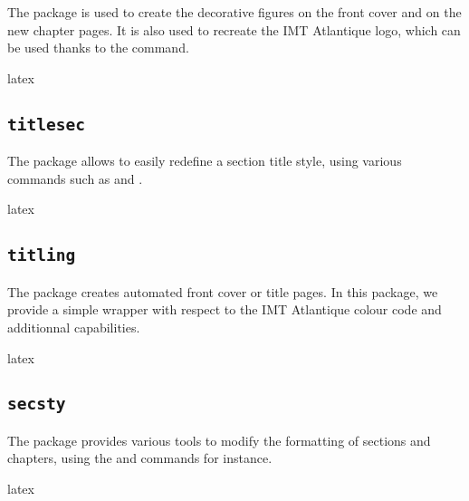 \documentclass{report}
\begin{document}
The  package is used to create the decorative figures on the front cover and on the new chapter pages. It is also used to recreate the IMT Atlantique logo, which can be used thanks to the  command.

\begin{imtaCode}{latex}
\RequirePackage{tikz}
\end{imtaCode}

\subsection{\texttt{titlesec}}

The  package allows to easily redefine a section title style, using various commands such as  and .

\begin{imtaCode}{latex}
\RequirePackage{titlesec}
\end{imtaCode}

\subsection{\texttt{titling}}

The  package creates automated front cover or title pages. In this package, we provide a simple wrapper with respect to the IMT Atlantique colour code and additionnal capabilities.

\begin{imtaCode}{latex}
\RequirePackage{titling}
\end{imtaCode}


\subsection{\texttt{secsty}}

The  package provides various tools to modify the formatting of sections and chapters, using the  and  commands for instance.

\begin{imtaCode}{latex}
\RequirePackage{secsty}
\end{imtaCode}


%
%
\end{document}
